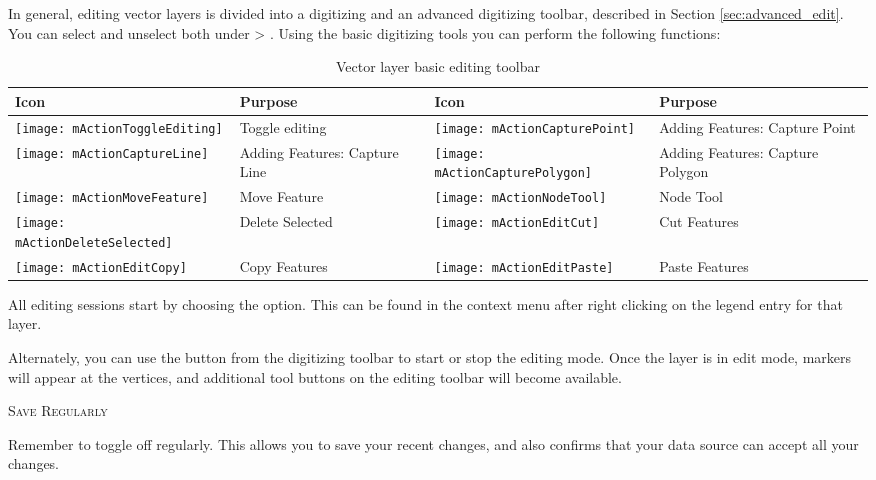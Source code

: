 In general, editing vector layers is divided into a digitizing and an advanced
digitizing toolbar, described in Section \ref{sec:advanced_edit}. You can
select and unselect both under  > .
Using the basic digitizing tools you can perform the following functions:

\begin{table}[h]
\centering
\caption{Vector layer basic editing toolbar}\label{tab:vector_editing}\medskip
\small
\begin{tabular}{|l|p{6.9cm}|l|p{6.9cm}|}
\hline \textbf{Icon} & \textbf{Purpose} & \textbf{Icon} & \textbf{Purpose} \\
\hline \texttt{[image: mActionToggleEditing]}
   & Toggle editing
   & \texttt{[image: mActionCapturePoint]}
   & Adding Features: Capture Point \\
\hline \texttt{[image: mActionCaptureLine]}
   & Adding Features: Capture Line
   & \texttt{[image: mActionCapturePolygon]}
   & Adding Features: Capture Polygon \\
\hline \texttt{[image: mActionMoveFeature]}
   & Move Feature
   & \texttt{[image: mActionNodeTool]}
   & Node Tool \\ 
\hline \texttt{[image: mActionDeleteSelected]}
   & Delete Selected
   & \texttt{[image: mActionEditCut]}
   & Cut Features \\
\hline \texttt{[image: mActionEditCopy]}
   & Copy Features
   & \texttt{[image: mActionEditPaste]} 
   & Paste Features \\
\hline
\end{tabular}
\end{table}

All editing sessions start by choosing the
 option.
This can be found in the context menu after right clicking on the legend
entry for that layer.

Alternately, you can use the 
 button from the digitizing
toolbar to start or stop the editing mode. Once the
layer is in edit mode, markers will appear at the vertices, and additional
tool buttons on the editing toolbar will become available.

\begin{Tip}[ht]\caption{\textsc{Save Regularly}}
Remember to toggle 
off regularly. This allows you to save your recent changes, and also confirms
that your data source can accept all your changes.
\end{Tip}

